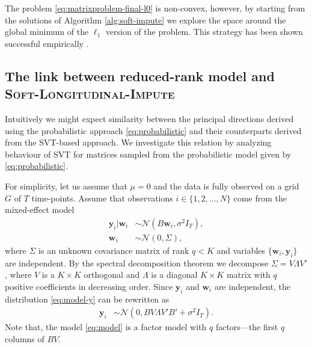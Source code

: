 \documentclass[preprint]{imsart}
\numberwithin{equation}{section}
\theoremstyle{plain}
\newcommand{\cN}{\mathcal{N}}
\newcommand{\by}{\mathbf{y}}
\newcommand{\bw}{\mathbf{w}}
\begin{document}
The problem \eqref{eq:matrixproblem-final-l0} is non-convex, however, by starting from the solutions of Algorithm \ref{alg:soft-impute} we explore the space around the global minimum of the $\ell_1$ version of the problem. This strategy has been shown successful empirically \citep{ge2016matrix}.


\subsection{The link between reduced-rank model and \textsc{Soft-Longitudinal-Impute}}\label{s:the-link}


Intuitively we might expect similarity between the principal directions derived using the probabilistic approach \eqref{eq:probabilistic} and their counterparts derived from the SVT-based approach. We investigate this relation by analyzing behaviour of SVT for matrices sampled from the probabilistic model given by \eqref{eq:probabilistic}.

For simplicity, let us assume that $\mu = 0$ and the data is fully observed on a grid $G$ of $T$ time-points. Assume that observations $i \in \{1,2,...,N\}$ come from the mixed-effect model
\begin{align}
  \by_i | \bw_i &\sim \cN( B \bw_i, \sigma^2 I_T), \label{eq:model-y}\\
  \bw_i &\sim \cN(0 , \Sigma), \nonumber%
\end{align}
%
where $\Sigma$ is an unknown covariance matrix of rank $q < K$ and variables $\{\bw_i, \by_i\}$ are independent. By the spectral decomposition theorem we decompose $\Sigma = V\Lambda V'$, where $V$ is a $K\times K$ orthogonal and $\Lambda$ is a diagonal $K\times K$ matrix with $q$ positive coefficients in decreasing order.
Since $\by_i$ and $\bw_i$ are independent, the distribution \eqref{eq:model-y} can be rewritten as
\begin{align}
  \by_i &\sim \cN(0, B V \Lambda V'  B' + \sigma^2 I_T). \label{eq:model}
\end{align}
Note that, the model \eqref{eq:model} is a factor model with $q$ factors---the first $q$ columns of $BV$.
\end{document}
